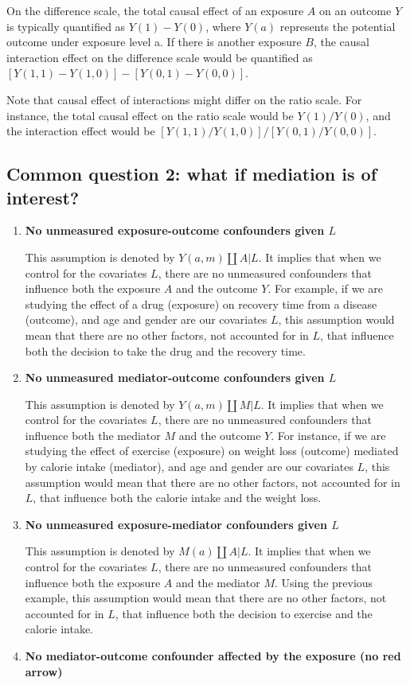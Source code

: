 \documentclass[
  singlecolumn]{report}
\begin{document}
On the difference scale, the total causal effect of an exposure \(A\) on
an outcome \(Y\) is typically quantified as \(Y(1) - Y(0)\), where
\(Y(a)\) represents the potential outcome under exposure level a. If
there is another exposure \(B\), the causal interaction effect on the
difference scale would be quantified as
\([Y(1,1) - Y(1,0)] - [Y(0,1) - Y(0,0)]\).

Note that causal effect of interactions might differ on the ratio scale.
For instance, the total causal effect on the ratio scale would be
\(Y(1) / Y(0)\), and the interaction effect would be
\([Y(1,1) / Y(1,0)] / [Y(0,1) / Y(0,0)]\).

\hypertarget{common-question-2-what-if-mediation-is-of-interest}{%
\subsection{Common question 2: what if mediation is of
interest?}\label{common-question-2-what-if-mediation-is-of-interest}}

\begin{enumerate}
\def\labelenumi{\arabic{enumi}.}
\item
  \textbf{No unmeasured exposure-outcome confounders given \(L\)}

  This assumption is denoted by \(Y(a,m) \coprod A | L\). It implies
  that when we control for the covariates \(L\), there are no unmeasured
  confounders that influence both the exposure \(A\) and the outcome
  \(Y\). For example, if we are studying the effect of a drug (exposure)
  on recovery time from a disease (outcome), and age and gender are our
  covariates \(L\), this assumption would mean that there are no other
  factors, not accounted for in \(L\), that influence both the decision
  to take the drug and the recovery time.
\item
  \textbf{No unmeasured mediator-outcome confounders given \(L\)}

  This assumption is denoted by \(Y(a,m) \coprod M | L\). It implies
  that when we control for the covariates \(L\), there are no unmeasured
  confounders that influence both the mediator \(M\) and the outcome
  \(Y\). For instance, if we are studying the effect of exercise
  (exposure) on weight loss (outcome) mediated by calorie intake
  (mediator), and age and gender are our covariates \(L\), this
  assumption would mean that there are no other factors, not accounted
  for in \(L\), that influence both the calorie intake and the weight
  loss.
\item
  \textbf{No unmeasured exposure-mediator confounders given \(L\)}

  This assumption is denoted by \(M(a) \coprod A | L\). It implies that
  when we control for the covariates \(L\), there are no unmeasured
  confounders that influence both the exposure \(A\) and the mediator
  \(M\). Using the previous example, this assumption would mean that
  there are no other factors, not accounted for in \(L\), that influence
  both the decision to exercise and the calorie intake.
\item
  \textbf{No mediator-outcome confounder affected by the exposure (no
  red arrow)}
\end{enumerate}
\end{document}
